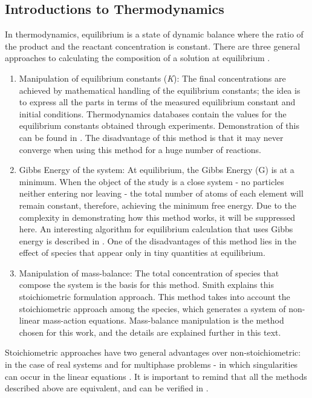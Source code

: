 \subsection{Introductions to Thermodynamics}
In thermodynamics, equilibrium is a state of dynamic balance where the ratio of the product and the reactant concentration is constant. There are three general approaches to calculating the composition of a solution at equilibrium \cite{Petrucci}.
\begin{enumerate}
    \item Manipulation of equilibrium constants (\emph{K}): The final concentrations are achieved by mathematical handling of the equilibrium constants; the idea is to express all the parts in terms of the measured equilibrium constant and initial conditions. Thermodynamics databases contain the values for the equilibrium constants obtained through experiments. Demonstration of this can be found in \cite{Kehew:00}. The disadvantage of this method is that it may never converge when using this method for a huge number of reactions.
    \item Gibbs Energy of the system: At equilibrium, the Gibbs Energy (G) is at a minimum. When the object of the study is a close system - no particles neither entering nor leaving - the total number of atoms of each element will remain constant, therefore, achieving the minimum free energy. Due to the complexity in demonstrating how this method works, it will be suppressed here. An interesting algorithm for equilibrium calculation that uses Gibbs energy is described in \cite{Allan:15}. One of the disadvantages of this method lies in the effect of species that appear only in tiny quantities at equilibrium.
    \item Manipulation of mass-balance: The total concentration of species that compose the system is the basis for this method. Smith \cite{Smith:80} explains this stoichiometric formulation approach. This method takes into account the stoichiometric approach among the species, which generates a system of non-linear mass-action equations. Mass-balance manipulation is the method chosen for this work, and the details are explained further in this text.
\end{enumerate}

Stoichiometric approaches have two general advantages over non-stoichiometric: in the case of real systems and for multiphase problems - in which singularities can occur in the linear equations \cite{Smith:80}. It is important to remind that all the methods described above are equivalent, and can be verified in \cite{Zeggeren:70}.

